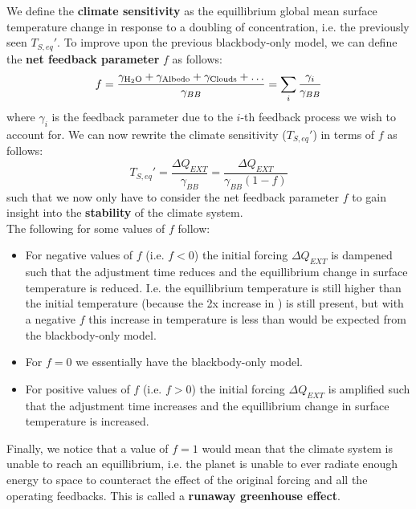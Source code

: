 We define the \textbf{climate sensitivity} as the equillibrium global mean surface
temperature change in response to a doubling of  concentration, i.e.
the previously seen $T_{S,eq}'$. To improve upon the previous blackbody-only
model, we can define the \textbf{net feedback parameter} $f$ as follows:
$$
f = \frac{\gamma_{\ce{H2O}} + \gamma_{\text{Albedo}} + \gamma_{\text{Clouds}} + 
\dots}{\gamma_{BB}} = \sum_i \frac{\gamma_i}{\gamma_{BB}}
$$
where $\gamma_i$ is the feedback parameter due to the $i$-th feedback process 
we wish to account for. We can now rewrite the climate sensitivity ($T_{S,eq}'$)
in terms of $f$ as follows:
$$
T_{S,eq}' = \frac{\Delta Q_{EXT}}{\gamma_{BB}} = \boxed{\frac{\Delta Q_{EXT}}{
\gamma_{BB} (1 - f)}}
$$
such that we now only have to consider the net feedback parameter $f$ to gain
insight into the \textbf{stability} of the climate system.\\

The following for some values of $f$ follow:
\begin{itemize}
    \item For negative values of $f$ (i.e. $f < 0$) the initial forcing $\Delta
    Q_{EXT}$ is dampened such that the adjustment time reduces and the equillibrium
    change in surface temperature is reduced. I.e. the equillibrium temperature
    is still higher than the initial temperature (because the 2x increase in )
    is still present, but with a negative $f$ this increase in temperature is less
    than would be expected from the blackbody-only model.
    \item For $f = 0$ we essentially have the blackbody-only model.
    \item For positive values of $f$ (i.e. $f > 0$) the initial forcing $\Delta
    Q_{EXT}$ is amplified such that the adjustment time increases and the equillibrium
    change in surface temperature is increased. 
\end{itemize}

Finally, we notice that a value of $f = 1$ would mean that the climate system
is unable to reach an equillibrium, i.e. the planet is unable to ever radiate 
enough energy to space to counteract the effect of the original forcing and all
the operating feedbacks. This is called a \textbf{runaway greenhouse effect}.
